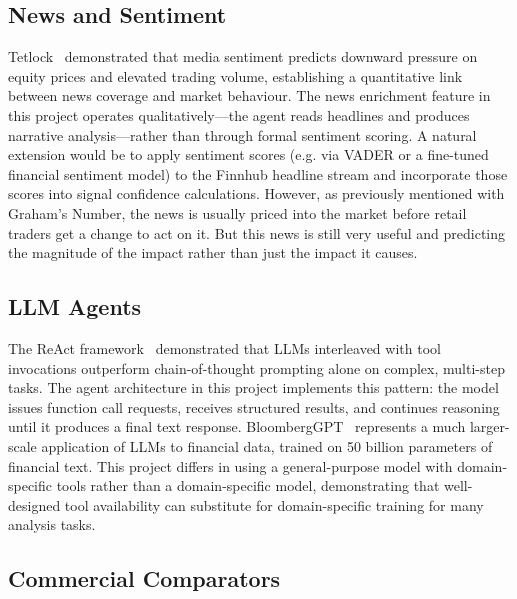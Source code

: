 \documentclass[12pt,a4paper]{article}
\begin{document}
\subsection{News and Sentiment}

Tetlock~\cite{tetlock2007} demonstrated that media sentiment predicts downward pressure on equity prices and elevated trading volume, establishing a quantitative link between news coverage and market behaviour. The news enrichment feature in this project operates qualitatively---the agent reads headlines and produces narrative analysis---rather than through formal sentiment scoring. A natural extension would be to apply sentiment scores (e.g. via VADER or a fine-tuned financial sentiment model) to the Finnhub headline stream and incorporate those scores into signal confidence calculations. However, as previously mentioned with Graham's Number, the news is usually priced into the market before retail traders get a change to act on it. But this news is still very useful and predicting the magnitude of the impact rather than just the impact it causes.

\subsection{LLM Agents}

The ReAct framework~\cite{yao2022} demonstrated that LLMs interleaved with tool invocations outperform chain-of-thought prompting alone on complex, multi-step tasks. The agent architecture in this project implements this pattern: the model issues function call requests, receives structured results, and continues reasoning until it produces a final text response. BloombergGPT~\cite{wu2023} represents a much larger-scale application of LLMs to financial data, trained on 50 billion parameters of financial text. This project differs in using a general-purpose model with domain-specific tools rather than a domain-specific model, demonstrating that well-designed tool availability can substitute for domain-specific training for many analysis tasks.

\subsection{Commercial Comparators}
\end{document}
